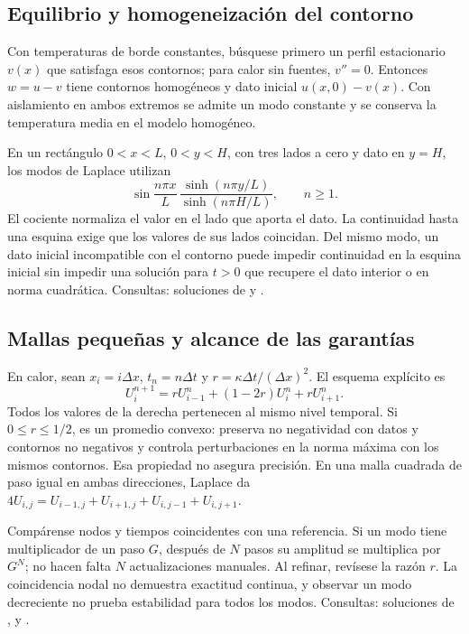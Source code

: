 %
\subsection*{Equilibrio y homogeneización del contorno}
\label{CH10-B03}
Con temperaturas de borde constantes, búsquese primero un perfil
estacionario $v(x)$ que satisfaga esos contornos; para calor sin fuentes,
$v''=0$. Entonces $w=u-v$ tiene contornos homogéneos y dato inicial
$u(x,0)-v(x)$. Con aislamiento en ambos extremos se admite un modo
constante y se conserva la temperatura media en el modelo homogéneo.

En un rectángulo $0<x<L$, $0<y<H$, con tres lados a cero y dato en
$y=H$, los modos de Laplace utilizan
\[
 \sin\frac{n\pi x}{L}\,
 \frac{\sinh(n\pi y/L)}{\sinh(n\pi H/L)},\qquad n\ge1.
\]
El cociente normaliza el valor en el lado que aporta el dato.
La continuidad hasta una esquina exige que los valores de sus lados
coincidan. Del mismo modo, un dato inicial incompatible con el contorno
puede impedir continuidad en la esquina inicial sin impedir una solución
para $t>0$ que recupere el dato interior o en norma cuadrática.
Consultas: soluciones de  y .

%
\subsection*{Mallas pequeñas y alcance de las garantías}
\label{CH10-B04}
En calor, sean $x_i=i\Delta x$, $t_n=n\Delta t$ y
$r=\kappa\Delta t/(\Delta x)^2$. El esquema explícito es
\[
 U_i^{n+1}=rU_{i-1}^n+(1-2r)U_i^n+rU_{i+1}^n.
\]
Todos los valores de la derecha pertenecen al mismo nivel temporal.
Si $0\le r\le1/2$, es un promedio convexo: preserva no negatividad
con datos y contornos no negativos y controla perturbaciones en la norma
máxima con los mismos contornos. Esa propiedad no asegura precisión.
En una malla cuadrada de paso igual en ambas direcciones, Laplace da
$4U_{i,j}=U_{i-1,j}+U_{i+1,j}+U_{i,j-1}+U_{i,j+1}$.

Compárense nodos y tiempos coincidentes con una referencia. Si un modo
tiene multiplicador de un paso $G$, después de $N$ pasos su amplitud se
multiplica por $G^N$; no hacen falta $N$ actualizaciones manuales.
Al refinar, revísese la razón $r$. La coincidencia nodal no demuestra
exactitud continua, y observar un modo decreciente no prueba estabilidad
para todos los modos. Consultas: soluciones de ,
 y .

%
